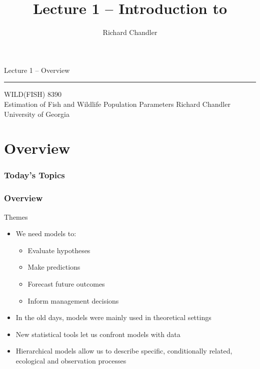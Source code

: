 \documentclass[color=usenames,dvipsnames,handout]{beamer}\usepackage[]{graphicx}\usepackage[]{color}
\title{Lecture 1 -- Introduction to }
\author{Richard Chandler}
\begin{document}



\begin{frame}[plain]
  \LARGE
  \centering
  {\huge %
    Lecture 1 -- Overview} \\
  {\color{default} \rule{\textwidth}{0.1pt}}
  \vfill
  \large
  WILD(FISH) 8390 \\
  Estimation of Fish and Wildlife Population Parameters
  \vfill
  Richard Chandler \\
  University of Georgia \\
\end{frame}




\section{Overview}


\begin{frame}[plain]
  \frametitle{Today's Topics}
  \Large
\end{frame}



\begin{frame}
  \frametitle{Overview}
  {\Large Themes}
  \begin{itemize}
    \item<2-> We need models to:
      \begin{itemize}
        \item Evaluate hypotheses
        \item Make predictions
        \item Forecast future outcomes
        \item Inform management decisions
      \end{itemize}
    \item<3-> In the old days, models were mainly used in theoretical settings
    \item<4-> New statistical tools let us confront models with data
    \item<5-> Hierarchical models allow us to describe specific,
      conditionally related, ecological and observation processes
  \end{itemize}
\end{frame}
\end{document}
